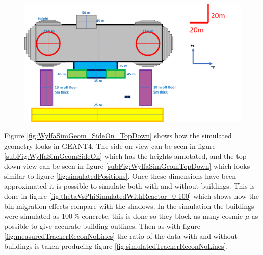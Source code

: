 \begin{figure}[!h]
 \centering
 \includegraphics[width=\linewidth]{Chapter5/Figs/wylfaRasterNew/simulatedHeights.png}
 \label{fig:simulatedHeights}
\end{figure}

Figure \ref{fig:WylfaSimGeom_SideOn_TopDown} shows how the simulated geometry looks in  GEANT4. The side-on view can be seen in figure \ref{subFig:WylfaSimGeomSideOn} which has the heights annotated, and the top-down view can be seen in figure \ref{subFig:WylfaSimGeomTopDown} which looks similar to figure \ref{fig:simulatedPositions}. Once these dimensions have been approximated it is possible to simulate both with and without buildings. This is done in figure \ref{fig:thetaVsPhiSimulatedWithReactor_0-100} which shows how the bin migration effects compare with the shadows. In the simulation the buildings were simulated as 100\,\% concrete, this is done so they block as many cosmic $\mu$ as possible to give accurate building outlines. Then as with figure  \ref{fig:measuredTrackerReconNoLines} the ratio of the data with and without buildings is taken producing figure \ref{fig:simulatedTrackerReconNoLines}. 

